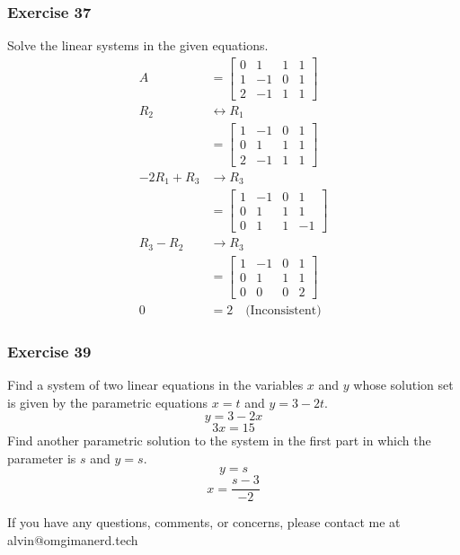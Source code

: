\documentclass{math}
\begin{document}
\subsubsection*{Exercise 37}
Solve the linear systems in the given equations.
\begin{align*}
  A &= \left[\begin{array}{ccc|c}
    0 & 1 & 1 & 1 \\
    1 & -1 & 0 & 1 \\
    2 & -1 & 1 & 1
  \end{array}\right] \\
  R_2 &\leftrightarrow R_1 \\
  &= \left[\begin{array}{ccc|c}
    1 & -1 & 0 & 1 \\
    0 & 1 & 1 & 1 \\
    2 & -1 & 1 & 1
  \end{array}\right] \\
  -2R_1+R_3 &\to R_3 \\
  &= \left[\begin{array}{ccc|c}
    1 & -1 & 0 & 1 \\
    0 & 1 & 1 & 1 \\
    0 & 1 & 1 & -1
  \end{array}\right] \\
  R_3-R_2 &\to R_3 \\
  &= \left[\begin{array}{ccc|c}
    1 & -1 & 0 & 1 \\
    0 & 1 & 1 & 1 \\
    0 & 0 & 0 & 2
  \end{array}\right] \\
  0 &= 2 \quad \text{(Inconsistent)}
\end{align*}

\subsubsection*{Exercise 39}
Find a system of two linear equations in the variables \( x \) and \( y \)
whose solution set is given by the parametric equations \( x = t \) and
\( y = 3-2t \).
\[ y = 3-2x \]
\[ 3x = 15 \]
Find another parametric solution to the system in the first part in which
the parameter is \( s \) and \( y = s \).
\[ y = s \]
\[ x = \frac{s-3}{-2} \]

\begin{center}
  If you have any questions, comments, or concerns, please contact me at
  alvin@omgimanerd.tech
\end{center}
\end{document}
